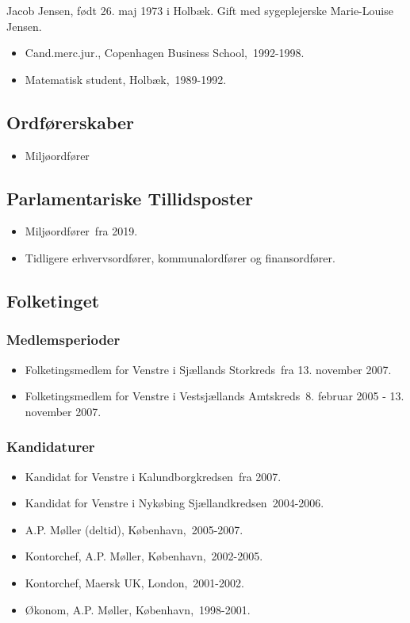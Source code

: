\documentclass[11pt, a4paper]{awesome-cv}
\begin{document}
\makecvheader[R]
\makelettertitle
\begin{cvletter}
Jacob Jensen, født 26. maj 1973 i Holbæk. Gift med sygeplejerske Marie-Louise Jensen.

\begin{itemize}
\item Cand.merc.jur., Copenhagen Business School, 1992-1998.
\item Matematisk student, Holbæk, 1989-1992.
\end{itemize}
\subsection*{Ordførerskaber}
\begin{itemize}
\item Miljøordfører
\end{itemize}
\subsection*{Parlamentariske Tillidsposter}
\begin{itemize}
\item Miljøordfører fra 2019.
\item Tidligere erhvervsordfører, kommunalordfører og finansordfører.
\end{itemize}
\subsection*{Folketinget}
\subsubsection*{Medlemsperioder}
\begin{itemize}
\item Folketingsmedlem for Venstre i Sjællands Storkreds fra 13. november 2007.
\item Folketingsmedlem for Venstre i Vestsjællands Amtskreds 8. februar 2005 - 13. november 2007.
\end{itemize}
\subsubsection*{Kandidaturer}
\begin{itemize}
\item Kandidat for Venstre i Kalundborgkredsen fra 2007.
\item Kandidat for Venstre i Nykøbing Sjællandkredsen 2004-2006.
\end{itemize}
\begin{itemize}
\item A.P. Møller (deltid), København, 2005-2007.
\item Kontorchef, A.P. Møller, København, 2002-2005.
\item Kontorchef, Maersk UK, London, 2001-2002.
\item Økonom, A.P. Møller, København, 1998-2001.
\end{itemize}
\end{cvletter}
\end{document}
